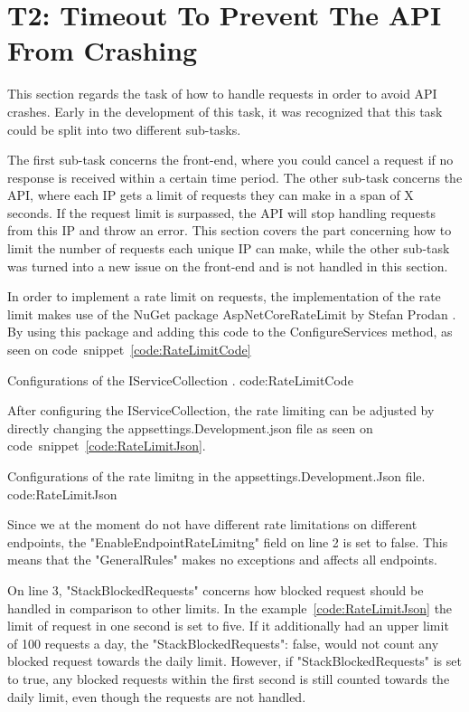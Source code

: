 \section{T2: Timeout To Prevent The API From  Crashing}
This section regards the task of how to handle requests in order to avoid API crashes. Early in the development of this task, it was recognized that this task could be split into two different sub-tasks. 

The first sub-task concerns the front-end, where you could cancel a request if no response is received within a certain time period.
The other sub-task concerns the API, where each IP gets a limit of requests they can make in a span of X seconds. If the request limit is surpassed, the API will stop handling requests from this IP and throw an error.
This section covers the part concerning how to limit the number of requests each unique IP can make, while the other sub-task was turned into a new issue on the front-end and is not handled in this section.

In order to implement a rate limit on requests, the implementation of the rate limit makes use of the NuGet package AspNetCoreRateLimit by Stefan Prodan \citep{cite:RateLimitGithub}. By using this package and adding this code to the ConfigureServices method, as seen on code~snippet~\ref{code:RateLimitCode}

        {Configurations of the IServiceCollection \citep{cite:RateLimitGithub}.} %
        {code:RateLimitCode} %

After configuring the IServiceCollection, the rate limiting can be adjusted by directly changing the appsettings.Development.json file as seen on code~snippet~\ref{code:RateLimitJson}.

        {Configurations of the rate limitng in the appsettings.Development.Json file.} %
        {code:RateLimitJson} %

Since we at the moment do not have different rate limitations on different endpoints, the "EnableEndpointRateLimitng" field on line 2 is set to false. This means that the "GeneralRules" makes no exceptions and affects all endpoints. 

On line 3, "StackBlockedRequests" concerns how blocked request should be handled in comparison to other limits. In the example~\ref{code:RateLimitJson} the limit of request in one second is set to five. If it additionally had an upper limit of 100 requests a day, the "StackBlockedRequests": false, would not count any blocked request towards the daily limit. However, if "StackBlockedRequests" is set to true, any blocked requests within the first second is still counted towards the daily limit, even though the requests are not handled.

